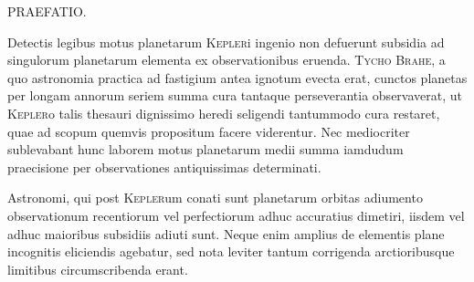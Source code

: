 \clearpage
{}
\begin{center}\Large PRAEFATIO.\end{center}
\medskip
{}Detectis legibus motus planetarum \textsc{Kepler}i ingenio non defuerunt subsidia ad singulorum planetarum elementa ex observationibus eruenda. \textsc{Tycho Brahe}, a quo astronomia practica ad fastigium antea ignotum evecta erat, cunctos planetas per longam annorum seriem summa cura tantaque perseverantia observaverat, ut \textsc{Kepler}o talis thesauri dignissimo heredi seligendi tantummodo cura restaret, quae ad scopum quemvis propositum facere viderentur. Nec mediocriter sublevabant hunc laborem motus planetarum medii summa iamdudum praecisione per observationes antiquissimas determinati.

Astronomi, qui post \textsc{Kepler}um conati sunt planetarum orbitas adiumento observationum recentiorum vel perfectiorum adhuc accuratius dimetiri, iisdem vel adhuc maioribus subsidiis adiuti sunt. Neque enim amplius de elementis plane incognitis eliciendis agebatur, sed nota leviter tantum corrigenda arctioribusque limitibus circumscribenda erant.

